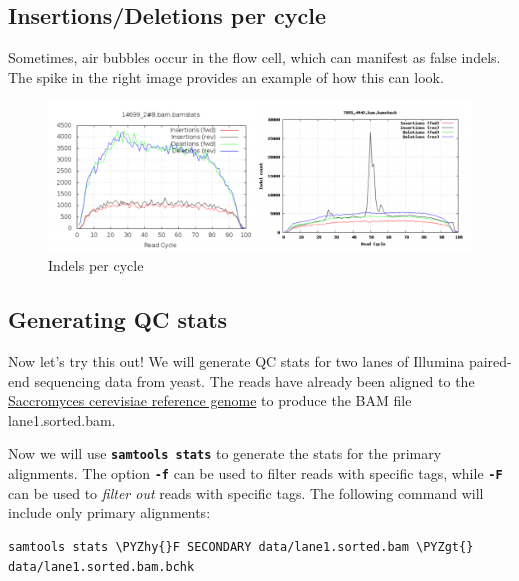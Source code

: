\documentclass[11pt]{article}
\makeatletter
\def\PYZgt{\char`\>}
\def\PYZhy{\char`\-}
\newcommand{\boxspacing}{\kern\kvtcb@left@rule\kern\kvtcb@boxsep}
\newcommand{\prompt}[4]{
        {\ttfamily\llap{{\color{blue}\LARGE\faKeyboardO\hspace{3pt}#4}}\vspace{-\baselineskip}}
    }
\makeatother
\begin{document}
    \hypertarget{insertionsdeletions-per-cycle}{%
\subsection{Insertions/Deletions per
cycle}\label{insertionsdeletions-per-cycle}}

Sometimes, air bubbles occur in the flow cell, which can manifest as
false indels. The spike in the right image provides an example of how
this can look.

    \begin{figure}[!h]
\centering
\includegraphics{img/indels_per_cycle_comparison.png}
\caption{Indels per cycle}
\end{figure}

    \hypertarget{generating-qc-stats}{%
\subsection{Generating QC stats}\label{generating-qc-stats}}

Now let's try this out! We will generate QC stats for two lanes of
Illumina paired-end sequencing data from yeast. The reads have already
been aligned to the
\href{ftp://ftp.ensembl.org/pub/current_fasta/saccharomyces_cerevisiae/dna}{Saccromyces
cerevisiae reference genome} to produce the BAM file lane1.sorted.bam.

    Now we will use \textbf{\texttt{samtools\ stats}} to generate the stats
for the primary alignments. The option \textbf{\texttt{-f}} can be used
to filter reads with specific tags, while \textbf{\texttt{-F}} can be
used to \textit{filter out} reads with specific tags. The following
command will include only primary alignments:

    \begin{tcolorbox}[breakable, size=fbox, boxrule=1pt, pad at break*=1mm,colback=cellbackground, colframe=cellborder]
\prompt{In}{incolor}{ }{\boxspacing}
\begin{Verbatim}[commandchars=\\\{\}]
samtools stats \PYZhy{}F SECONDARY data/lane1.sorted.bam \PYZgt{} data/lane1.sorted.bam.bchk
\end{Verbatim}
\end{tcolorbox}
\end{document}

